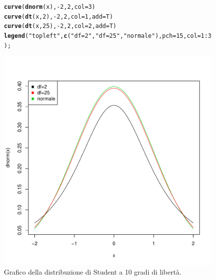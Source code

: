 \documentclass[onecolumn,12pt]{book}\usepackage[]{graphicx}\usepackage[]{color}
\makeatletter
\def\maxwidth{ %
  \ifdim\Gin@nat@width>\linewidth
    \linewidth
  \else
    \Gin@nat@width
  \fi
}
\newcommand{\hlnum}[1]{\textcolor[rgb]{0.686,0.059,0.569}{#1}}%
\newcommand{\hlstr}[1]{\textcolor[rgb]{0.192,0.494,0.8}{#1}}%
\newcommand{\hlopt}[1]{\textcolor[rgb]{0,0,0}{#1}}%
\newcommand{\hlstd}[1]{\textcolor[rgb]{0.345,0.345,0.345}{#1}}%
\newcommand{\hlkwc}[1]{\textcolor[rgb]{0.333,0.667,0.333}{#1}}%
\newcommand{\hlkwd}[1]{\textcolor[rgb]{0.737,0.353,0.396}{\textbf{#1}}}%
\newenvironment{kframe}{%
 \def\at@end@of@kframe{}%
 \ifinner\ifhmode%
  \def\at@end@of@kframe{\end{minipage}}%
  \begin{minipage}{\columnwidth}%
 \fi\fi%
 \def\FrameCommand##1{\hskip\@totalleftmargin \hskip-\fboxsep
 \colorbox{shadecolor}{##1}\hskip-\fboxsep
     \hskip-\linewidth \hskip-\@totalleftmargin \hskip\columnwidth}%
 \MakeFramed {\advance\hsize-\width
   \@totalleftmargin\z@ \linewidth\hsize
   \@setminipage}}%
 {\par\unskip\endMakeFramed%
 \at@end@of@kframe}
\newenvironment{knitrout}{}{} %
\makeatother
\begin{document}
\begin{figure}[H]
\begin{center}
\begin{knitrout}
\color{fgcolor}\begin{kframe}
\begin{alltt}
\hlkwd{curve}\hlstd{(}\hlkwd{dnorm}\hlstd{(x),}\hlopt{-}\hlnum{2}\hlstd{,}\hlnum{2}\hlstd{,}\hlkwc{col}\hlstd{=}\hlnum{3}\hlstd{)}
\hlkwd{curve}\hlstd{(}\hlkwd{dt}\hlstd{(x,}\hlnum{2}\hlstd{),}\hlopt{-}\hlnum{2}\hlstd{,}\hlnum{2}\hlstd{,}\hlkwc{col}\hlstd{=}\hlnum{1}\hlstd{,}\hlkwc{add}\hlstd{=T)}
\hlkwd{curve}\hlstd{(}\hlkwd{dt}\hlstd{(x,}\hlnum{25}\hlstd{),}\hlopt{-}\hlnum{2}\hlstd{,}\hlnum{2}\hlstd{,}\hlkwc{col}\hlstd{=}\hlnum{2}\hlstd{,}\hlkwc{add}\hlstd{=T)}
\hlkwd{legend}\hlstd{(}\hlstr{"topleft"}\hlstd{,} \hlkwd{c}\hlstd{(}\hlstr{"df=2"}\hlstd{,}\hlstr{"df=25"}\hlstd{,}\hlstr{"normale"}\hlstd{),}\hlkwc{pch}\hlstd{=}\hlnum{15}\hlstd{,}\hlkwc{col}\hlstd{=}\hlnum{1}\hlopt{:}\hlnum{3}\hlstd{);}
\end{alltt}
\end{kframe}
\includegraphics[width=\maxwidth]{figure/unnamed-chunk-152-1} 

\end{knitrout}
\caption{Grafico della distribuzione di Student a 10 gradi di libert\`a. }
\label{fig:graficostudent}
\end{center}
\end{figure}
\end{document}
